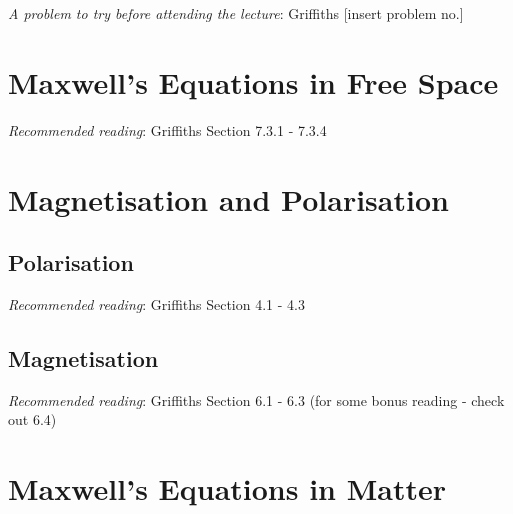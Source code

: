 \documentclass[
  letterpaper,
  DIV=11,
  numbers=noendperiod]{scrreprt}
\begin{document}
\emph{A problem to try before attending the lecture}: Griffiths
{[}insert problem no.{]}


\chapter{Maxwell's Equations in Free
Space}\label{maxwells-equations-in-free-space}

\newcommand{\l}{\mathrm{\mathbf{l}}}
\newcommand{\E}{\mathrm{\mathbf{E}}}
\newcommand{\F}{\mathrm{\mathbf{F}}}
\newcommand{\r}{\mathrm{\mathbf{r}}}

\newcommand{\x}{\mathrm{\mathbf{x}}}
\newcommand{\y}{\mathrm{\mathbf{y}}}
\newcommand{\z}{\mathrm{\mathbf{z}}}

\emph{Recommended reading}: Griffiths Section 7.3.1 - 7.3.4


\chapter{Magnetisation and
Polarisation}\label{magnetisation-and-polarisation}

\newcommand{\l}{\mathrm{\mathbf{l}}}
\newcommand{\E}{\mathrm{\mathbf{E}}}
\newcommand{\F}{\mathrm{\mathbf{F}}}
\newcommand{\r}{\mathrm{\mathbf{r}}}

\newcommand{\x}{\mathrm{\mathbf{x}}}
\newcommand{\y}{\mathrm{\mathbf{y}}}
\newcommand{\z}{\mathrm{\mathbf{z}}}

\section{Polarisation}\label{polarisation}

\emph{Recommended reading}: Griffiths Section 4.1 - 4.3

\section{Magnetisation}\label{magnetisation}

\emph{Recommended reading}: Griffiths Section 6.1 - 6.3 (for some bonus
reading - check out 6.4)


\chapter{Maxwell's Equations in
Matter}\label{maxwells-equations-in-matter}
\end{document}
